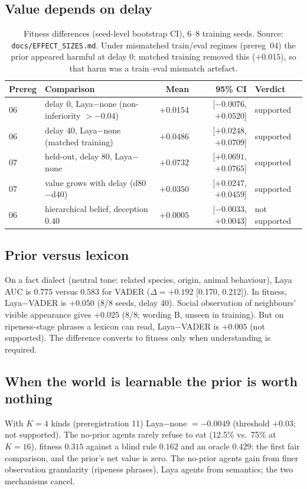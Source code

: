 \documentclass[11pt]{article}
\begin{document}
\subsection{Value depends on delay}
\begin{table}[h]\centering\small
\begin{tabular}{@{}llrrl@{}}\toprule
Prereg & Comparison & Mean & 95\% CI & Verdict\\\midrule
06 & delay 0, Laya$-$none (non-inferiority $>-0.04$) & $+0.0154$ & [$-0.0076$, $+0.0520$] & supported\\
06 & delay 40, Laya$-$none (matched training) & $+0.0486$ & [$+0.0248$, $+0.0709$] & supported\\
07 & held-out, delay 80, Laya$-$none & $+0.0732$ & [$+0.0691$, $+0.0765$] & supported\\
07 & value grows with delay (d80$-$d40) & $+0.0350$ & [$+0.0247$, $+0.0459$] & supported\\
06 & hierarchical belief, deception 0.40 & $+0.0005$ & [$-0.0033$, $+0.0043$] & not supported\\\bottomrule
\end{tabular}
\caption{\label{tab:effects}Fitness differences (seed-level bootstrap CI), 6--8 training seeds. Source: \texttt{docs/EFFECT\_SIZES.md}. Under mismatched train/eval regimes (prereg~04) the prior appeared harmful at delay 0; matched training removed this ($+0.015$), so that harm was a train--eval mismatch artefact.}
\end{table}

\subsection{Prior versus lexicon}
On a fact dialect (neutral tone: related species, origin, animal behaviour), Laya AUC is $0.775$ versus $0.583$ for VADER ($\Delta=+0.192$ [0.170, 0.212]). In fitness, Laya$-$VADER is $+0.050$ (8/8 seeds, delay 40). Social observation of neighbours' visible appearance gives $+0.025$ (8/8; wording B, unseen in training). But on ripeness-stage phrases a lexicon can read, Laya$-$VADER is $+0.005$ (not supported). The difference converts to fitness only when understanding is required.

\subsection{When the world is learnable the prior is worth nothing}
With $K=4$ kinds (preregistration 11) Laya$-$none $=-0.0049$ (threshold $+0.03$; not supported). The no-prior agents rarely refuse to eat (12.5\% vs.\ 75\% at $K=16$), fitness $0.315$ against a blind rule $0.162$ and an oracle $0.429$: the first fair comparison, and the prior's net value is zero. The no-prior agents gain from finer observation granularity (ripeness phrases), Laya agents from semantics; the two mechanisms cancel.
\end{document}
